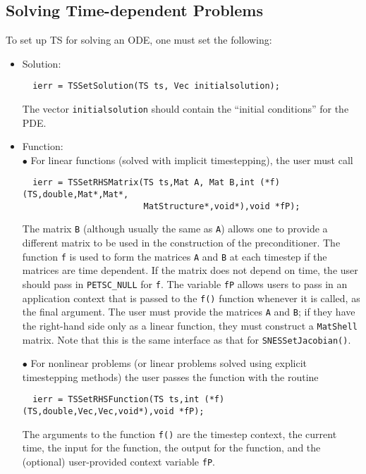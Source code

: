 \subsection{Solving Time-dependent Problems}
To set up TS for solving an ODE, one must set the following:

\begin{itemize}
\item Solution:\\
\begin{verbatim}
  ierr = TSSetSolution(TS ts, Vec initialsolution);
\end{verbatim}
The vector {\tt initialsolution} should contain the ``initial conditions''
for the PDE. 

\item Function: \\
\subitem $ \bullet $ For linear functions (solved with implicit timestepping),
 the user must call 
\begin{verbatim}
  ierr = TSSetRHSMatrix(TS ts,Mat A, Mat B,int (*f)(TS,double,Mat*,Mat*,
                        MatStructure*,void*),void *fP);
\end{verbatim}
The matrix {\tt B} (although usually the same as {\tt A}) allows one to 
provide 
a different matrix to be used in the construction of the preconditioner.
The function {\tt f} is used to form the matrices {\tt A} and {\tt B} 
at each timestep if the matrices are time dependent.
If the matrix does not depend on time, the user should 
pass in {\tt PETSC\_NULL} for {\tt f}.  The variable {\tt fP} allows 
users to pass in an application context that is passed to the {\tt f()} function 
whenever it is called, as the final argument. The user must provide the matrices
{\tt A} and {\tt B}; if they have the right-hand side only as a linear
function, they must construct a {\tt MatShell} matrix. Note that this is 
the same interface as that for {\tt SNESSetJacobian()}. 

\subitem $ \bullet $  For nonlinear problems (or linear problems solved using
explicit timestepping methods) the user  passes the function with 
the routine

\begin{verbatim}
  ierr = TSSetRHSFunction(TS ts,int (*f)(TS,double,Vec,Vec,void*),void *fP);
\end{verbatim}
The  arguments to the function {\tt f()} are
the timestep context, the current time, the input for the function,
the output for the function, and the (optional) user-provided context
variable {\tt fP}.


\end{itemize}
